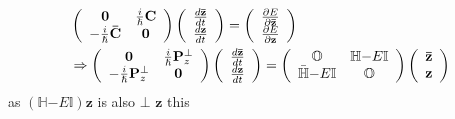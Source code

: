 \documentclass[aps,preprint]{revtex4}%
\begin{document}
\begin{align}
&  \left(
\begin{array}
[c]{cc}%
\mathbf{0} & \frac{i}{\hslash}\mathbf{C}\\
-\frac{i}{\hslash}\mathbf{\bar{C}} & \mathbf{0}%
\end{array}
\right)  \left(
\begin{array}
[c]{c}%
\frac{d\mathbf{\bar{z}}}{dt}\\
\frac{d\mathbf{z}}{dt}%
\end{array}
\right)  =\left(
\begin{array}
[c]{c}%
\frac{\partial E}{\partial\mathbf{\bar{z}}}\\
\frac{\partial E}{\partial\mathbf{z}}%
\end{array}
\right) \\
&  \Rightarrow\left(
\begin{array}
[c]{cc}%
\mathbf{0} & \frac{i}{\hslash}\mathbf{P}_{z}^{\bot}\\
-\frac{i}{\hslash}\mathbf{P}_{z}^{\bot} & \mathbf{0}%
\end{array}
\right)  \left(
\begin{array}
[c]{c}%
\frac{d\mathbf{\bar{z}}}{dt}\\
\frac{d\mathbf{z}}{dt}%
\end{array}
\right)  =\left(
\begin{array}
[c]{cc}%
\mathbb{O} & \mathbb{H}\mathbf{-}E\mathbb{I}\\
\mathbb{\bar{H}}\mathbf{-}E\mathbb{I} & \mathbb{O}%
\end{array}
\right)  \left(
\begin{array}
[c]{c}%
\mathbf{\bar{z}}\\
\mathbf{z}%
\end{array}
\right)
\end{align}
as $\left(  \mathbb{H}\mathbf{-}E\mathbb{I}\right)  \mathbf{z}$ is also $\bot$
$\mathbf{z}$ this%
\end{document}
